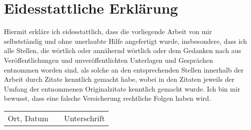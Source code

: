 \chapter*{Eidesstattliche Erklärung}
Hiermit erkläre ich eidesstattlich, dass die vorliegende Arbeit von mir selbstständig und ohne unerlaubte Hilfe angefertigt wurde, insbesondere, dass ich alle Stellen, die wörtlich oder annähernd wörtlich oder dem Gedanken nach aus Veröffentlichungen und unveröffentlichten Unterlagen und Gesprächen entnommen worden sind, als solche an den entsprechenden Stellen innerhalb der Arbeit durch Zitate kenntlich gemacht habe, wobei in den Zitaten jeweils der Umfang der entnommenen Originalzitate kenntlich gemacht wurde. Ich bin mir bewusst, dass eine falsche Versicherung rechtliche Folgen haben wird.
\vspace{3cm}

\begin{tabular}{p{}cp{}}
	\cline{1-1} \cline{3-3} \\
	\raggedright Ort, Datum & & \raggedright Unterschrift 
\end{tabular}